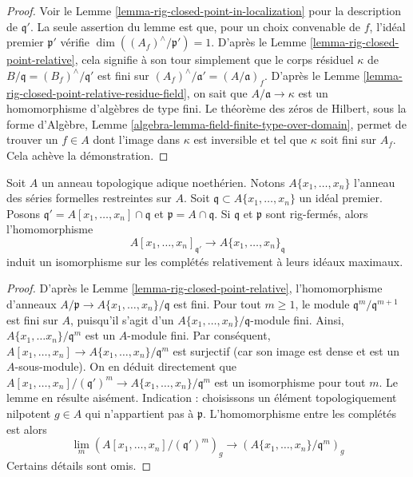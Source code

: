 \begin{proof}
Voir le Lemme \ref{lemma-rig-closed-point-in-localization}
pour la description de $\mathfrak q'$. La seule assertion du lemme
est que, pour un choix convenable de $f$, l'idéal premier $\mathfrak p'$
vérifie $\dim((A_f)^\wedge/\mathfrak p') = 1$.
D'après le Lemme \ref{lemma-rig-closed-point-relative}, cela signifie à son tour
simplement que le corps résiduel $\kappa$ de
$B/\mathfrak q = (B_f)^\wedge/\mathfrak q'$ est fini sur
$(A_f)^\wedge/\mathfrak a' = (A/\mathfrak a)_f$.
D'après le Lemme \ref{lemma-rig-closed-point-relative-residue-field},
on sait que $A/\mathfrak a \to \kappa$ est un homomorphisme d'algèbres
de type fini. Le théorème des zéros de Hilbert, sous la forme d'Algèbre,
Lemme \ref{algebra-lemma-field-finite-type-over-domain}, permet de trouver
un $f \in A$ dont l'image dans $\kappa$ est inversible et tel que
$\kappa$ soit fini sur $A_f$. Cela achève la démonstration.
\end{proof}

\begin{lemma}
\label{lemma-rig-closed-point-variables}
Soit $A$ un anneau topologique adique noethérien. Notons $A\{x_1, \ldots, x_n\}$
l'anneau des séries formelles restreintes sur $A$. Soit
$\mathfrak q \subset A\{x_1, \ldots, x_n\}$ un idéal premier.
Posons $\mathfrak q' = A[x_1, \ldots, x_n] \cap \mathfrak q$ et
$\mathfrak p = A \cap \mathfrak q$. Si $\mathfrak q$ et $\mathfrak p$
sont rig-fermés, alors l'homomorphisme
$$
A[x_1, \ldots, x_n]_{\mathfrak q'}
\to
A\{x_1, \ldots, x_n\}_\mathfrak q
$$
induit un isomorphisme sur les complétés relativement à leurs idéaux maximaux.
\end{lemma}

\begin{proof}
D'après le Lemme \ref{lemma-rig-closed-point-relative}, l'homomorphisme d'anneaux
$A/\mathfrak p \to A\{x_1, \ldots, x_n\}/\mathfrak q$ est fini.
Pour tout $m \geq 1$, le module $\mathfrak q^m/\mathfrak q^{m + 1}$
est fini sur $A$, puisqu'il s'agit d'un
$A\{x_1, \ldots, x_n\}/\mathfrak q$-module fini.
Ainsi, $A\{x_1, \ldots x_n\}/\mathfrak q^m$ est un $A$-module fini.
Par conséquent, $A[x_1, \ldots, x_n] \to A\{x_1, \ldots, x_n\}/\mathfrak q^m$
est surjectif (car son image est dense et est un $A$-sous-module).
On en déduit directement que
$A[x_1, \ldots, x_n]/(\mathfrak q')^m \to A\{x_1, \ldots, x_n\}/\mathfrak q^m$
est un isomorphisme pour tout $m$. Le lemme en résulte aisément.
Indication : choisissons un élément topologiquement nilpotent $g \in A$ qui
n'appartient pas à $\mathfrak p$. L'homomorphisme entre les complétés est alors
$$
\lim_m \left(A[x_1, \ldots, x_n]/(\mathfrak q')^m\right)_g
\longrightarrow
\left(A\{x_1, \ldots, x_n\}/\mathfrak q^m\right)_g
$$
Certains détails sont omis.
\end{proof}

